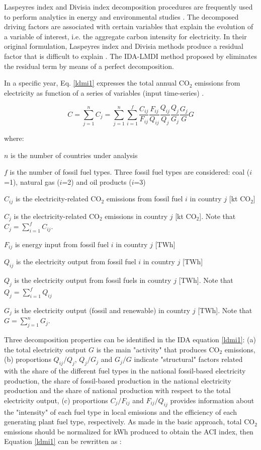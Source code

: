 \documentclass[energies,article,accept,moreauthors,12pt,a4paper]{mdpi} %
\begin{document}
Laspeyres index and Divisia index decomposition procedures are   frequently used to perform analytics in energy and environmental studies \cite{zhang2000}. The decomposed driving factors are associated with certain variables that explain the evolution of a variable of interest, i.e. the aggregate carbon intensity for electricity. In their original formulation, Laspeyres index and Divisia methods produce  a residual factor that is difficult to explain \cite{angperfect}. The IDA-LMDI method proposed by \cite{angperfect} eliminates the residual term by means of a perfect decomposition.



In a specific year, Eq. \ref{ldmi1} expresses the total annual  CO$_2$ emissions from electricity as function of a series of variables (input time-series) \cite{ang2016}.

\begin{equation}\label{ldmi1}
  C=\sum^n_{j=1}	C_{j}=\sum^n_{j=1}\sum^f_{i=1}\frac{C_{ij}}{F_{ij}}
  \frac{F_{ij}}{Q_{ij}} \frac{Q_{ij}}{Q_{j}} \frac{Q_{j}}{G_{j}} \frac{G_{j}}{G} G
\end{equation}


where:

$n$ is the number of countries under analysis

$f$ is the number of fossil fuel types. Three fossil fuel types are considered: coal ($i$=1),  natural gas ($i$=2) and   oil products ($i$=3)

$C_{ij}$ is the electricity-related CO$_2$ emissions from fossil fuel $i$ in country $j$  [kt CO$_2$]

$C_{j}$ is the electricity-related CO$_2$ emissions in country $j$ [kt CO$_2$]. Note that $C_{j}=\sum_{i=1}^f C_{ij}$.



$F_{ij}$ is energy input from fossil fuel $i$ in country $j$ [TWh]

$Q_{ij}$ is the electricity output from fossil fuel $i$ in country $j$ [TWh]

$Q_{j}$ is the electricity output from fossil fuels in country $j$ [TWh]. Note that $Q_{j}=\sum_{i=1}^f Q_{ij}$

$G_{j}$ is the  electricity output (fossil and renewable) in country $j$ [TWh].  Note that $G=\sum_{j=1}^n G_{j}$.


 Three decomposition properties can be identified in the IDA equation \ref{ldmi1}: (a) the total electricity output $G$ is the main "activity" that produces CO$_2$ emissions, (b) proportions
${Q_{ij}}/{Q_{j}}$, ${Q_{j}}/{G_{j}}$ and  ${G_{j}}/{G}$ indicate "structural" factors related with the share of the different fuel types in the national fossil-based electricity production, the share of fossil-based production in the national electricity production and the share of national production with respect to the total electricity output, (c) proportions ${C_{j}}/{F_{ij}}$ and ${F_{ij}}/{Q_{ij}}$ provides information about the "intensity" of  each fuel type in local emissions and the efficiency of each generating plant fuel type, respectively. As made in the basic approach,  total CO$_2$ emissions should be normalized for kWh produced  to obtain the ACI index, then Equation \ref{ldmi1} can be rewritten as \cite{ang2016}:
\end{document}
